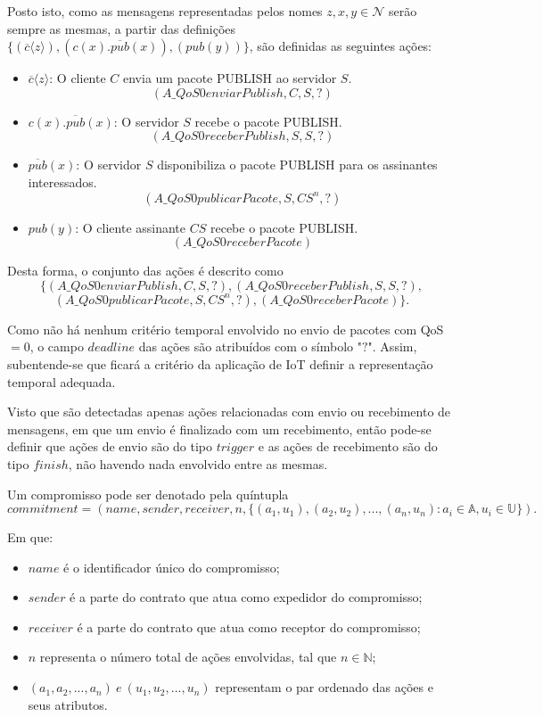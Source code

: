 Posto isto, como as mensagens representadas pelos nomes $z, x, y \in \mathcal{N}$ serão sempre as mesmas, a partir das definições $\{(\overline{c}\langle z \rangle), (c(x).\overline{pub}(x)), (pub(y)) \}$, são definidas as seguintes ações:
\begin{itemize}
	\item $ \overline{c}\langle z \rangle $: O cliente $C$ envia um pacote PUBLISH ao servidor $S$. $$(A\_QoS0enviarPublish,C,S,?)$$
	\item  $c(x).\overline{pub}(x)$: O servidor $S$ recebe o pacote PUBLISH. $$(A\_QoS0receberPublish,S,S,?)$$
	\item $ \overline{pub}(x) $: O servidor $S$ disponibiliza o pacote PUBLISH para os assinantes interessados. $$(A\_QoS0publicarPacote,S,CS^{n},?)$$
	\item $pub(y)$: O cliente assinante $CS$ recebe o pacote PUBLISH. $$(A\_QoS0receberPacote)$$
\end{itemize}

Desta forma, o conjunto das ações é descrito como $$\{(A\_QoS0enviarPublish,C,S,?), (A\_QoS0receberPublish,S,S,?),$$ $$(A\_QoS0publicarPacote,S,CS^{n},?), (A\_QoS0receberPacote)\}.$$

Como não há nenhum critério temporal envolvido no envio de pacotes com QoS$=0$, o campo $deadline$ das ações são atribuídos com o símbolo "$?$". Assim, subentende-se que ficará a critério da aplicação de IoT definir a representação temporal adequada.

Visto que são detectadas apenas ações relacionadas com envio ou recebimento de mensagens, em que um envio é finalizado com um recebimento, então pode-se definir que ações de envio são do tipo $trigger$ e as ações de recebimento são do tipo $finish$, não havendo nada envolvido entre as mesmas.

Um compromisso pode ser denotado pela quíntupla $$commitment = (name, sender, receiver, n, \{(a_{1},u_{1}), (a_{2}, u_{2}), ..., (a_{n}, u_{n}) \colon a_{i} \in \mathbb{A}, u_{i} \in \mathbb{U}\}).$$

Em que:

\begin{itemize}
	\item $name$ é o identificador único do compromisso;
	\item $sender$ é a parte do contrato que atua como expedidor do compromisso;
	\item $receiver$ é a parte do contrato que atua como receptor do compromisso;
	\item $n$ representa o número total de ações envolvidas, tal que $n \in \mathbb{N}$;
	\item $(a_{1},a_{2},...,a_{n})~e~(u_{1},u_{2},...,u_{n})$ representam o par ordenado das ações e seus atributos.
\end{itemize}

